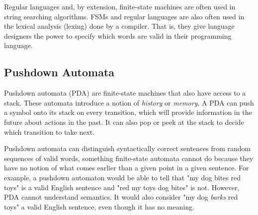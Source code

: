 \vspace{4mm}
\begin{center}
\end{center}
\vspace{5mm}

Regular languages and, by extension, finite-state machines are often used in string searching algorithms. FSMs and regular languages are also often used in the lexical analysis (lexing) done by a compiler. That is, they give language designers the power to specify which words are valid in their programming language.

\subsection{Pushdown Automata}

Pushdown automata (PDA) are finite-state machines that also have access to a stack. These automata introduce a notion of \textit{history} or \textit{memory}. A PDA can push a symbol onto its stack on every transition, which will provide information in the future about actions in the past. It can also pop or peek at the stack to decide which transition to take next.

Pushdown automata can distinguish syntactically correct sentences from random sequences of valid words, something finite-state automata cannot do because they have no notion of what comes earlier than a given point in a given sentence. For example, a pushdown automaton would be able to tell that "my dog bites red toys" is a valid English sentence and "red my toys dog bites" is not. However, PDA cannot understand semantics. It would also consider "my dog \textit{barks} red toys" a valid English sentence, even though it has no meaning.

